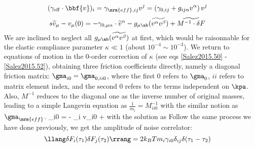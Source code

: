 $$ (\gamma_{\rm{eff}} \cdot \bbf{v})_i = \gamma_{\mrm{eff},ij} v^j = \left( \gamma_{0,ij} + g_{ij\alpha} v^\alpha \right) v^j $$
$$ s \widetilde{v}_\mu - v_\mu (0) = -\gamma_{0,\mu\alpha} \cdot \widetilde{v}^\alpha - g_{\mu\ab} (\widetilde{v^\alpha v^\beta}) + \widetilde{M^{-1} \cdot \delta F} $$
We are inclined to neglect all $g_{\mu\ab} (\widetilde{v^\alpha v^\beta})$ at first, which would be raisonnable for the elastic compliance parameter $\kappa \ll 1$ (about $10^{-4} \sim 10^{-3}$). We return to equations of motion in the 0-order correction of $\kappa$ (see eqs \ref{Salez2015.50} - \ref{Salez2015.52}), obtaining three friction coefficients directly, namely  a diagonal friction matrix: $\gma_{i0} = \gma_{0,ii0}$, where the first 0 refers to $\gma_0$, $ii$ refers to matrix element index, and the second 0 refers to the terms independent on $\kpa$.
Also, $M^{-1}$ reduces to the diagonal one as the inverse number of original masses, leading to a simple Langevin equation as $\frac{1}{m_i} = M^{-1}_{ii0}$ with the similar notion as $\gma_{\mrm{eff}}$.
\beq {}_{i0} = - \gamma_{i} v_{i0} +  \label{Yilin.28} \eeq
with the solution as
Follow the same process we have done previously, we get the amplitude of noise correlator:
$$ \llang \delta F_i (\tau_1) \delta F_j(\tau_2) \rrang = 2 k_B T m_i \gamma_{i0} \delta_{ij} \delta(\tau_1 - \tau_2) $$


